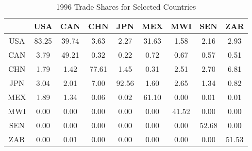 \begin{table}[!htbp]
\centering
\begin{tabular}{ccccccccc}
  \hline
 & USA & CAN & CHN & JPN & MEX & MWI & SEN & ZAR \\ 
  \hline
USA & 83.25 & 39.74 & 3.63 & 2.27 & 31.63 & 1.58 & 2.16 & 2.93 \\ 
  CAN & 3.79 & 49.21 & 0.32 & 0.22 & 0.72 & 0.67 & 0.57 & 0.51 \\ 
  CHN & 1.79 & 1.42 & 77.61 & 1.45 & 0.31 & 2.51 & 2.70 & 6.81 \\ 
  JPN & 3.04 & 2.01 & 7.00 & 92.56 & 1.60 & 2.65 & 1.34 & 0.82 \\ 
  MEX & 1.89 & 1.34 & 0.06 & 0.02 & 61.10 & 0.00 & 0.01 & 0.01 \\ 
  MWI & 0.00 & 0.00 & 0.00 & 0.00 & 0.00 & 41.52 & 0.00 & 0.00 \\ 
  SEN & 0.00 & 0.00 & 0.00 & 0.00 & 0.00 & 0.00 & 52.68 & 0.00 \\ 
  ZAR & 0.00 & 0.01 & 0.00 & 0.00 & 0.00 & 0.00 & 0.00 & 51.53 \\ 
   \hline
\end{tabular}
\caption{1996 Trade Shares for Selected Countries} 
\label{table_1_waugh}
\end{table}
